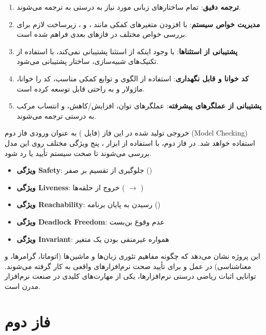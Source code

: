 \documentclass[12pt]{report}
\begin{document}
	\begin{enumerate}
		\item \textbf{ترجمه دقیق}: تمام ساختارهای زبانی مورد نیاز به درستی به  ترجمه می‌شوند.
		
		\item \textbf{مدیریت خواص سیستم}: با افزودن متغیرهای کمکی مانند ،  و ، زیرساخت لازم برای بررسی خواص مختلف در فازهای بعدی فراهم شده است.
		
		\item \textbf{پشتیبانی از استثناها}: با وجود اینکه  از استثنا پشتیبانی نمی‌کند، با استفاده از تکنیک‌های شبیه‌سازی، ساختار  پشتیبانی می‌شود.
		
		\item \textbf{کد خوانا و قابل نگهداری}: استفاده از الگوی  و توابع کمکی مناسب، کد را خوانا، ماژولار و به راحتی قابل توسعه کرده است.
		
		\item \textbf{پشتیبانی از عملگرهای پیشرفته}: عملگرهای توان، افزایش/کاهش، و انتساب مرکب به درستی ترجمه می‌شوند.
	\end{enumerate}
	
	خروجی تولید شده در این فاز (فایل ) به عنوان ورودی فاز دوم (Model Checking) استفاده خواهد شد. در فاز دوم، با استفاده از ابزار ، پنج ویژگی مختلف روی این مدل بررسی می‌شوند تا صحت سیستم تأیید یا رد شود.
	
	\begin{itemize}
		\item \textbf{ویژگی Safety}: جلوگیری از تقسیم بر صفر ()
		\item \textbf{ویژگی Liveness}: خروج از حلقه‌ها ( $\rightarrow$ )
		\item \textbf{ویژگی Reachability}: رسیدن به پایان برنامه ()
		\item \textbf{ویژگی Deadlock Freedom}: عدم وقوع بن‌بست
		\item \textbf{ویژگی Invariant}: همواره غیرمنفی بودن یک متغیر
	\end{itemize}
	
	این پروژه نشان می‌دهد که چگونه مفاهیم تئوری زبان‌ها و ماشین‌ها (اتوماتا، گرامرها، و معناشناسی) در عمل و برای تأیید صحت نرم‌افزارهای واقعی به کار گرفته می‌شوند. توانایی اثبات ریاضی درستی نرم‌افزارها، یکی از مهارت‌های کلیدی در صنعت نرم‌افزار مدرن است.
	
	
	\chapter*{فاز دوم}
\end{document}
